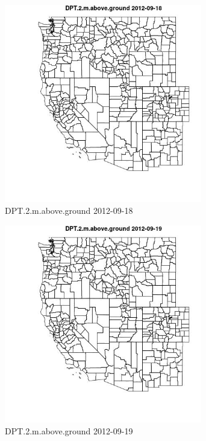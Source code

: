 \begin{figure} 
\centering  
\includegraphics[width=0.77\textwidth]{Code_Outputs/ML_input_report_ML_input_PM25_Step5_part_d_de_duplicated_aves_ML_input_MapObsDPT2maboveground2012-09-18.jpg} 
\caption{\label{fig:ML_input_report_ML_input_PM25_Step5_part_d_de_duplicated_aves_ML_inputMapObsDPT2maboveground2012-09-18}DPT.2.m.above.ground 2012-09-18} 
\end{figure} 
 

\clearpage 

\begin{figure} 
\centering  
\includegraphics[width=0.77\textwidth]{Code_Outputs/ML_input_report_ML_input_PM25_Step5_part_d_de_duplicated_aves_ML_input_MapObsDPT2maboveground2012-09-19.jpg} 
\caption{\label{fig:ML_input_report_ML_input_PM25_Step5_part_d_de_duplicated_aves_ML_inputMapObsDPT2maboveground2012-09-19}DPT.2.m.above.ground 2012-09-19} 
\end{figure} 
 

